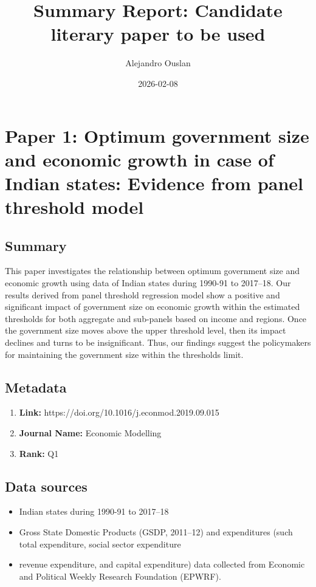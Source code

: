 \documentclass[10pt, oneside]{article}
\title{Summary Report: Candidate literary paper to be used}
\author{Alejandro Ouslan}
\date{2026-02-08}
\begin{document}
\maketitle
\tableofcontents

\vspace{.25in}

\section{Paper 1: Optimum government size and economic growth in case of Indian states: Evidence from panel threshold model}

\subsection{Summary}
This paper investigates the relationship between optimum government size and economic growth using data of
Indian states during 1990-91 to 2017–18. Our results derived from panel threshold regression model show a
positive and significant impact of government size on economic growth within the estimated thresholds for both
aggregate and sub-panels based on income and regions. Once the government size moves above the upper
threshold level, then its impact declines and turns to be insignificant. Thus, our findings suggest the policymakers
for maintaining the government size within the thresholds limit. \cite{akram2020optimum}

\subsection{Metadata}
\begin{enumerate}
	\item \textbf{Link:} https://doi.org/10.1016/j.econmod.2019.09.015
	\item \textbf{Journal Name:} Economic Modelling
	\item \textbf{Rank:} Q1
\end{enumerate}

\subsection{Data sources}
\begin{itemize}
	\item Indian states during 1990-91 to 2017–18
	\item Gross State Domestic Products (GSDP, 2011–12) and expenditures (such total expenditure, social sector expenditure
	\item revenue expenditure, and capital expenditure) data collected from Economic and Political Weekly Research Foundation (EPWRF).
\end{itemize}
\end{document}
